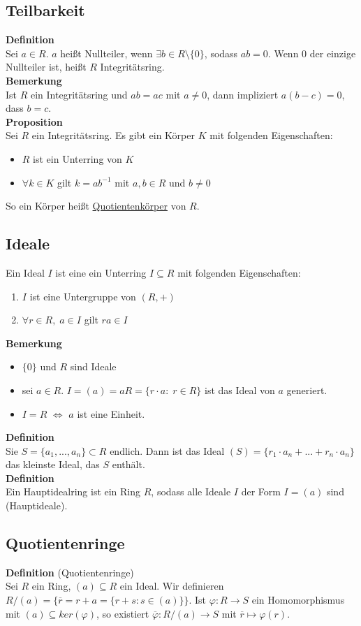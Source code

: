 \documentclass[a4paper, 12pt]{article}
\begin{document}
\subsection{Teilbarkeit}
\textbf{Definition}\\
Sei $a \in R$. $a$ heißt Nullteiler, wenn $\exists b \in R\setminus\{0\}$, sodass $ab = 0$. Wenn $0$ der einzige Nullteiler ist, heißt $R$ Integritätsring.\\
\textbf{Bemerkung}\\
Ist $R$ ein Integritätsring und $ab = ac$ mit $a\neq 0$, dann impliziert $a(b-c) = 0$, dass $b=c$.\\
\textbf{Proposition}\\
Sei $R$ ein Integritätsring. Es gibt ein Körper $K$ mit folgenden Eigenschaften: \begin{itemize}
	\item $R$ ist ein Unterring von $K$
	\item $\forall k \in K$ gilt $k = ab^{-1}$ mit $a,b \in R$ und $b\neq 0$
\end{itemize}
So ein Körper heißt \underline{Quotientenkörper} von $R$.
\subsection{Ideale}
Ein Ideal $I$ ist eine ein Unterring $I\subseteq R$ mit folgenden Eigenschaften: \begin{enumerate}
	\item $I$ ist eine Untergruppe von $(R,+)$
	\item $\forall r \in R, \; a \in I$ gilt $ra \in I$
\end{enumerate}
\textbf{Bemerkung}
\begin{itemize}
	\item $\{0\}$ und $R$ sind Ideale
	\item sei $a \in R$. $I = (a) = aR = \{r\cdot a: \; r \in R\}$ ist das Ideal von $a$ generiert.
	\item $I=R$ $\Leftrightarrow$ $a$ ist eine Einheit.
\end{itemize}
\textbf{Definition}\\
Sie $S = \{a_1,...,a_n\} \subset R$ endlich. Dann ist das Ideal $(S) = \{r_1\cdot a_n+...+r_n\cdot a_n\}$ das kleinste Ideal, das $S$ enthält.\\
\textbf{Definition}\\
Ein Hauptidealring ist ein Ring $R$, sodass alle Ideale $I$ der Form $I = (a)$ sind (Hauptideale).
\subsection{Quotientenringe}
\textbf{Definition} (Quotientenringe)\\
Sei $R$ ein Ring, $(a) \subseteq R$ ein Ideal. Wir definieren $R/(a) = \{\overline{r} = r+a = \{r+s : s \in (a)\}\}$. Ist $\varphi: R \to S$ ein Homomorphismus mit $(a) \subseteq ker(\varphi)$, so existiert $\overline{\varphi}: R/(a) \to S$ mit $\overline{r} \mapsto \varphi(r)$.\\
\end{document}
